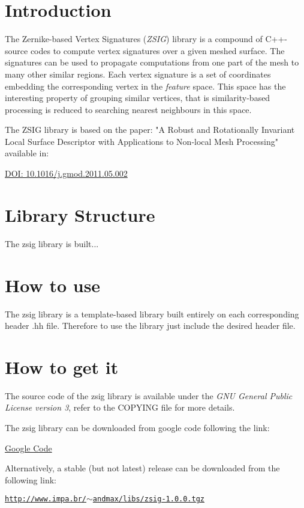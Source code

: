 \hypertarget{main_introduction}{}\section{Introduction}\label{main_introduction}
The Zernike-\/based Vertex Signatures ({\itshape ZSIG\/}) library is a compound of C++-\/source codes to compute vertex signatures over a given meshed surface. The signatures can be used to propagate computations from one part of the mesh to many other similar regions. Each vertex signature is a set of coordinates embedding the corresponding vertex in the {\itshape feature\/} space. This space has the interesting property of grouping similar vertices, that is similarity-\/based processing is reduced to searching nearest neighbours in this space.

The ZSIG library is based on the paper: "A Robust and Rotationally Invariant Local Surface Descriptor with Applications to Non-\/local Mesh Processing" available in:

  \href{http://dx.doi.org/10.1016/j.gmod.2011.05.002}{DOI: 10.1016/j.gmod.2011.05.002} \hypertarget{main_structure}{}\section{Library Structure}\label{main_structure}
The zsig library is built...\hypertarget{main_usage}{}\section{How to use}\label{main_usage}
The zsig library is a template-\/based library built entirely on each corresponding header {\itshape \/}.hh file. Therefore to use the library just include the desired header file.\hypertarget{main_download}{}\section{How to get it}\label{main_download}
The source code of the zsig library is available under the {\itshape GNU General Public License version 3\/}, refer to the COPYING file for more details.

The zsig library can be downloaded from google code following the link:

  \href{https://code.google.com/p/zsig}{Google Code} 

Alternatively, a stable (but not latest) release can be downloaded from the following link:

\href{http://www.impa.br/~andmax/libs/zsig-1.0.0.tgz}{\tt http://www.impa.br/$\sim$andmax/libs/zsig-\/1.0.0.tgz}

